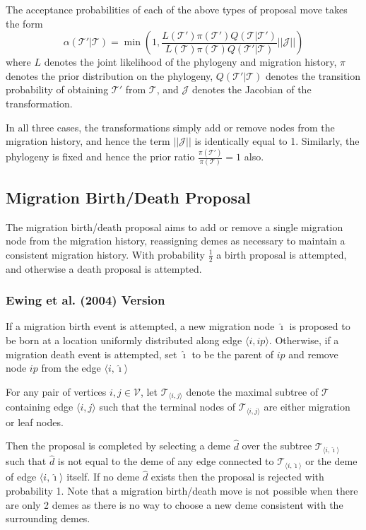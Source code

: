 \documentclass[12pt,a4paper]{article}
\newcommand{\calJ}{\mathcal{J}}
\newcommand{\calT}{\mathcal{T}}
\newcommand{\calV}{\mathcal{V}}
\newcommand{\ihat}{\hat{\imath}}
\begin{document}
		The acceptance probabilities of each of the above types of proposal move takes the form
			\begin{equation}
				\alpha(\calT' | \calT) = \min \left( 1, \frac{L(\calT') \pi(\calT') Q(\calT | \calT')}{L(\calT) \pi(\calT) Q(\calT' | \calT)} || \calJ || \right)
			\end{equation}
		where $L$ denotes the joint likelihood of the phylogeny and migration history, $\pi$ denotes the prior distribution on the phylogeny, $Q(\calT' | \calT)$ denotes the transition probability of obtaining $\calT'$ from $\calT$, and $\calJ$ denotes the Jacobian of the transformation.
		
		In all three cases, the transformations simply add or remove nodes from the migration history, and hence the term $||\calJ||$ is identically equal to 1. Similarly, the phylogeny is fixed and hence the prior ratio $\frac{\pi(\calT')}{\pi(\calT)} = 1$ also.
		
		\subsection{Migration Birth/Death Proposal}
			The migration birth/death proposal aims to add or remove a single migration node from the migration history, reassigning demes as necessary to maintain a consistent migration history. With probability $\frac{1}{2}$ a birth proposal is attempted, and otherwise a death proposal is attempted.
			
			\subsubsection{Ewing et al. (2004) Version}
				If a migration birth event is attempted, a new migration node $\ihat$ is proposed to be born at a location uniformly distributed along edge $\langle i, ip \rangle$. Otherwise, if a migration death event is attempted, set $\ihat$ to be the parent of $ip$ and remove node $ip$ from the edge $\langle i, \ihat \rangle$
				
				For any pair of vertices $i,j \in \calV$, let $\calT_{\langle i, j \rangle}$ denote the maximal subtree of $\calT$ containing edge $\langle i, j \rangle$ such that the terminal nodes of $\calT_{\langle i, j \rangle}$ are either migration or leaf nodes.
				
				Then the proposal is completed by selecting a deme $\hat{d}$ over the subtree $\calT_{\langle i, \ihat \rangle}$ such that $\hat{d}$ is not equal to the deme of any edge connected to $\calT_{\langle i, \ihat \rangle}$ or the deme of edge $\langle i, \ihat \rangle$ itself. If no deme $\hat{d}$ exists then the proposal is rejected with probability 1. Note that a migration birth/death move is not possible when there are only 2 demes as there is no way to choose a new deme consistent with the surrounding demes.
				
\end{document}
